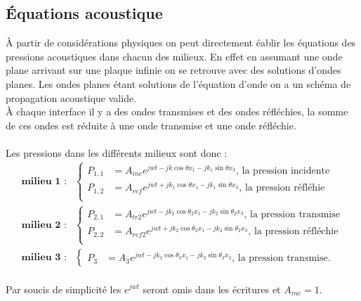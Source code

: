 \documentclass[12pt,foolscap]{report}
\begin{document}
\subsection*{Équations acoustique}
À partir de considérations physiques on peut directement éablir les équations des pressions acoustiques dans chacun des milieux. En effet en assumant une onde plane arrivant sur une plaque infinie on se retrouve avec des solutions d'ondes planes. Les ondes planes étant solutions de l'équation d'onde on a un schéma de propagation acoustique valide.\\ 
À chaque interface il y a des ondes transmises et des ondes réfléchies, la somme de ces ondes est réduite à une onde transmise et une onde réfléchie.\\ \\
Les pressions dans les différents milieux sont donc : 
\begin{align}
\textbf{milieu 1 :} &
\begin{cases}
P_{1,1} &= A_{inc}e^{jwt-jk\cos\theta x_1-jk_1\sin\theta x_3} \text{, la pression incidente}\\
P_{1,2} &= A_{ref}e^{jwt+jk_1\cos\theta x_1-jk_1\sin\theta x_3}\text{, la pression réfléhie}\\
\end{cases}\\
\textbf{milieu 2 :} &
\begin{cases}
P_{2,1} &= A_{tr2}e^{jwt-jk_2\cos\theta_2 x_1-jk_2\sin\theta_2 x_3} \text{, la pression transmise}\\
P_{2,2} &= A_{ref2}e^{jwt+jk_2\cos\theta_2 x_1-jk_2\sin\theta_2 x_3}\text{, la pression réfléchie}\\
\end{cases}\\
\textbf{milieu 3 :} &
\begin{cases}
P_{3} &= A_{3}e^{jwt-jk_3\cos\theta_3 x_1-jk_3\sin\theta_3 x_3} \text{, la pression transmise.}
\end{cases}
\end{align}\\
Par soucis de simplicité les $e^{jwt}$ seront omis dans les écritures et $A_{inc}=1$.
\end{document}
